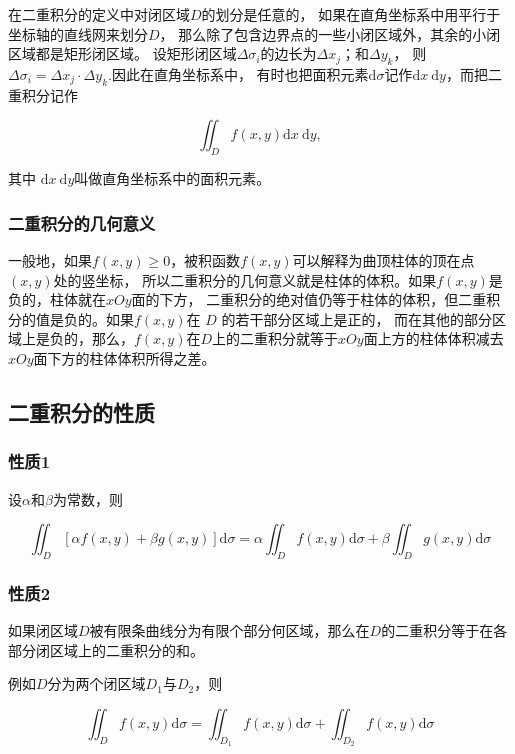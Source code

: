 \documentclass[12pt, a4paper]{article}
\numberwithin{equation}{section}
\begin{document}
    在二重积分的定义中对闭区域$D$的划分是任意的，
    如果在直角坐标系中用平行于坐标轴的直线网来划分$D$，
    那么除了包含边界点的一些小闭区域外，其余的小闭区域都是矩形闭区域。
    设矩形闭区域$\Delta \sigma_i$的边长为$\Delta x_j$；和$\Delta y_k$，
    则$\Delta \sigma_i=\Delta x_j \cdot \Delta y_k$.因此在直角坐标系中，
    有时也把面积元素$\mathrm{d} \sigma$记作$\mathrm{d} x \mathrm{~d} y$，而把二重积分记作

    $$
        \iint_D f(x, y) \mathrm{d} x \mathrm{~d} y,
    $$

    其中 $\mathrm{d} x \mathrm{~d} y$叫做直角坐标系中的面积元素。

\subsubsection{二重积分的几何意义}

    一般地，如果$f(x, y) \geq 0$，被积函数$f(x, y)$可以解释为曲顶柱体的顶在点$(x, y)$处的竖坐标，
    所以二重积分的几何意义就是柱体的体积。如果$f(x, y)$是负的，柱体就在$xOy$面的下方，
    二重积分的绝对值仍等于柱体的体积，但二重积分的值是负的。如果$f(x, y)$在 $D$ 的若干部分区域上是正的，
    而在其他的部分区域上是负的，那么，$f(x, y)$在$D$上的二重积分就等于$x O y$面上方的柱体体积减去$x O y$面下方的柱体体积所得之差。

\subsection{二重积分的性质}

\subsubsection{性质1}

    设\(\alpha\)和\(\beta\)为常数，则
    
    $$
        \iint_D[\alpha f(x, y)+\beta g(x, y)] \mathrm{d} \sigma=
        \alpha \iint_D f(x, y) \mathrm{d} \sigma+\beta \iint_D g(x, y) \mathrm{d} \sigma
    $$

\subsubsection{性质2}

    如果闭区域$D$被有限条曲线分为有限个部分何区域，那么在$D$的二重积分等于在各部分闭区域上的二重积分的和。

    例如$D$分为两个闭区域$D_1$与$D_2$，则
    
    $$
        \iint_D f(x, y) \mathrm{d} \sigma=\iint_{D_1} f(x, y) \mathrm{d} \sigma+\iint_{D_2} f(x, y) \mathrm{d} \sigma
    $$
\end{document}
